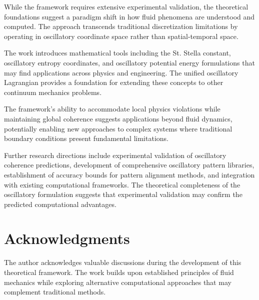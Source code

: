 \documentclass[12pt,a4paper]{article}
\begin{document}
While the framework requires extensive experimental validation, the theoretical foundations suggest a paradigm shift in how fluid phenomena are understood and computed. The approach transcends traditional discretization limitations by operating in oscillatory coordinate space rather than spatial-temporal space.

The work introduces mathematical tools including the St. Stella constant, oscillatory entropy coordinates, and oscillatory potential energy formulations that may find applications across physics and engineering. The unified oscillatory Lagrangian provides a foundation for extending these concepts to other continuum mechanics problems.

The framework's ability to accommodate local physics violations while maintaining global coherence suggests applications beyond fluid dynamics, potentially enabling new approaches to complex systems where traditional boundary conditions present fundamental limitations.

Further research directions include experimental validation of oscillatory coherence predictions, development of comprehensive oscillatory pattern libraries, establishment of accuracy bounds for pattern alignment methods, and integration with existing computational frameworks. The theoretical completeness of the oscillatory formulation suggests that experimental validation may confirm the predicted computational advantages.

\section{Acknowledgments}

The author acknowledges valuable discussions during the development of this theoretical framework. The work builds upon established principles of fluid mechanics while exploring alternative computational approaches that may complement traditional methods.
\end{document}
